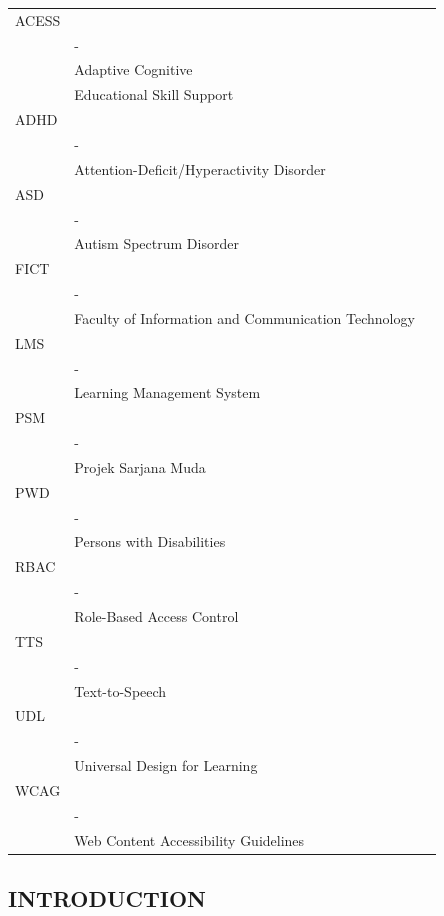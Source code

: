\documentclass[12pt,a4paper]{report}
\begin{document}
\noindent
\begin{tabular}{>{\raggedright\arraybackslash}p{2.5cm} >{\centering\arraybackslash}m{0.5cm} >{\raggedright\arraybackslash}p{11.0cm}}
ACESS \\& - \\& Adaptive Cognitive \\& Educational Skill Support \\
ADHD \\& - \\& Attention-Deficit/Hyperactivity Disorder \\
ASD \\& - \\& Autism Spectrum Disorder \\
FICT \\& - \\& Faculty of Information and Communication Technology \\
LMS \\& - \\& Learning Management System \\
PSM \\& - \\& Projek Sarjana Muda \\
PWD \\& - \\& Persons with Disabilities \\
RBAC \\& - \\& Role-Based Access Control \\
TTS \\& - \\& Text-to-Speech \\
UDL \\& - \\& Universal Design for Learning \\
WCAG \\& - \\& Web Content Accessibility Guidelines \\
\end{tabular}

\vfill \null
\newpage

\clearpage
{}
\setcounter{page}{1}

\setlength{\parindent}{30pt}

\vfill \null
\thispagestyle{empty}
\begin{center}
\section{INTRODUCTION}
\end{center}
\vspace{2cm}
\end{document}
